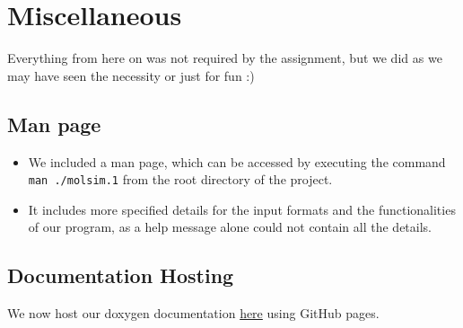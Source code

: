 \documentclass{article}
\begin{document}
\section{Miscellaneous}
Everything from here on was not required by the assignment, but we did as we may have seen the necessity or just for fun :)
\subsection{Man page}

\begin{itemize}
    \item We included a man page, which can be accessed by executing the command \texttt{man ./molsim.1} from the root directory of the project.
    \item It includes more specified details for the input formats and the functionalities of our program, as a help message alone could not contain all the details.
\end{itemize}

\subsection{Documentation Hosting}
We now host our doxygen documentation \href{https://noahpy.github.io/MolSim-SS24/}{here} using GitHub pages. 
\end{document}
